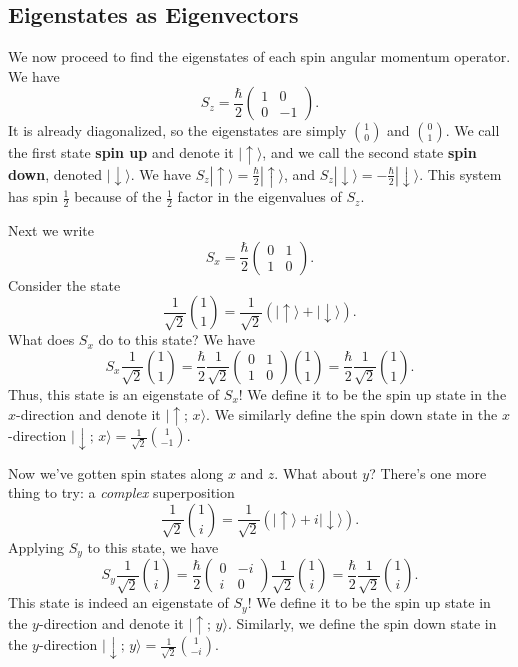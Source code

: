 \subsection{Eigenstates as Eigenvectors}\label{eigenstates_as_eigenvectors}

We now proceed to find the eigenstates of each spin angular momentum operator. We have $$S_z=\frac{\hbar}{2}\begin{pmatrix}1 & 0 \\ 0 & -1\end{pmatrix}.$$It is already diagonalized, so the eigenstates are simply $1\choose0$ and $0\choose1$. We call the first state \textbf{spin up} and denote it $|\uparrow\rangle$, and we call the second state \textbf{spin down}, denoted $|\downarrow\rangle$. We have $S_z|\uparrow\rangle=\frac{\hbar}{2}|\uparrow\rangle$, and $S_z|\downarrow\rangle=-\frac{\hbar}{2}|\downarrow\rangle$. This system has spin $\frac{1}{2}$ because of the $\frac{1}{2}$ factor in the eigenvalues of $S_z$.

Next we write $$S_x=\frac{\hbar}{2}\begin{pmatrix}0 & 1 \\ 1 & 0\end{pmatrix}.$$Consider the state $$\frac{1}{\sqrt{2}}{1\choose1}=\frac{1}{\sqrt{2}}(|\uparrow\rangle+|\downarrow\rangle).$$What does $S_x$ do to this state? We have $$S_x\frac{1}{\sqrt{2}}{1\choose1}=\frac{\hbar}{2}\frac{1}{\sqrt{2}}\begin{pmatrix}0 & 1 \\ 1 & 0\end{pmatrix}{1\choose1}=\frac{\hbar}{2}\frac{1}{\sqrt{2}}{1\choose1}.$$Thus, this state is an eigenstate of $S_x$! We define it to be the spin up state in the $x$-direction and denote it $|\uparrow;\,x\rangle$. We similarly define the spin down state in the $x$-direction $|\downarrow;\,x\rangle=\frac{1}{\sqrt{2}}{1\choose -1}$.

Now we've gotten spin states along $x$ and $z$. What about $y$? There's one more thing to try: a \textit{complex} superposition$$\frac{1}{\sqrt{2}}{1\choose i}=\frac{1}{\sqrt{2}}(|\uparrow\rangle+i|\downarrow\rangle).$$Applying $S_y$ to this state, we have $$S_y\frac{1}{\sqrt{2}}{1\choose i}=\frac{\hbar}{2}\begin{pmatrix}0 & -i \\ i & 0\end{pmatrix}\frac{1}{\sqrt{2}}{1\choose i}=\frac{\hbar}{2}\frac{1}{\sqrt{2}}{1\choose i}.$$This state is indeed an eigenstate of $S_y$! We define it to be the spin up state in the $y$-direction and denote it $|\uparrow;\,y\rangle$. Similarly, we define the spin down state in the $y$-direction $|\downarrow;\,y\rangle=\frac{1}{\sqrt{2}}{1\choose -i}$.

